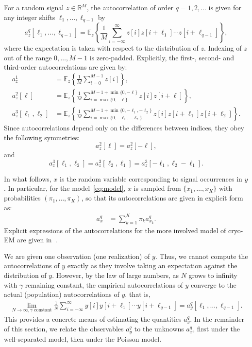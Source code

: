 \documentclass[12pt]{article}
\newcommand{\E}{\mathbb{E}}
\newcommand{\1}{\mathbf{1}}
\newcommand{\TODO}[1]{{\color{red}{[#1]}}}
\newcommand{\R}{\mathbb{R}}
\theoremstyle{plain}
\theoremstyle{definition}
\theoremstyle{remark}
\theoremstyle{plain}
\theoremstyle{remark}
\theoremstyle{plain}
\theoremstyle{plain}
\theoremstyle{plain}
\numberwithin{equation}{section}
\begin{document}
For a random signal $z\in \R^M$, the autocorrelation of order $q = 1, 2, \ldots$ is given for any integer shifts $\ell_1, \ldots, \ell_{q-1}$ by
\begin{equation}
a_z^q[\ell_1,\ldots,\ell_{q-1}]   = \E_z\left\{\frac{1}{M} \sum_{i=-\infty}^{\infty} z[i]z[i+\ell_1]\cdots z[i+\ell_{q-1}]\right\},
\label{eq:ac_general}
\end{equation}
where the expectation is taken with respect to the distribution of $z$. Indexing of $z$ out of the range $0, \ldots, M-1$ is zero-padded.
Explicitly, the first-, second- and third-order autocorrelations are given by: 
\begin{align}  
a_z^1 & = \E_z\left\{\frac{1}{M} \sum_{i=0}^{M-1} 
z[i]\right\}, \nonumber\\
a_z^2[\ell] & = \E_z\left\{\frac{1}{M} \sum_{i = \max\{0, -\ell\}}^{M-1 + \min\{0, -\ell\}} z[i]z[i+\ell]\right\}, \label{eq:ac_special} \\
a_z^3[\ell_1,\ell_2] & = \E_z\left\{\frac{1}{M} \sum_{i = \max\{0, -\ell_1, -\ell_2\}}^{M-1 + \min\{0, -\ell_1, -\ell_2\}} z[i]z[i+\ell_1]z[i+\ell_2]\right\}. \nonumber
\end{align}
Since  autocorrelations depend only on the differences between indices, they obey the following symmetries: $$a_z^2[\ell] = a_z^2[-\ell],$$ and
$$a_z^3[\ell_1,\ell_2] = a_z^3[\ell_2,\ell_1]=a_z^3[-\ell_1,\ell_2-\ell_1].
$$

In what follows, $x$ is the random variable corresponding to signal occurrences in $y$. In particular, for the model~\eqref{eq:model}, 
$x$ is sampled from $\{ x_1, \ldots, x_K \}$ with probabilities $(\pi_1, \ldots, \pi_K)$, so that its autocorrelations are given in explicit form as:
\begin{align}
	a_x^q  & = \sum_{k=1}^{K} \pi_ka_{x_k}^q.
	\label{eq:mixedautocorr}
\end{align}
Explicit expressions of the autocorrelations for the more involved model of  cryo-EM are given in~\cite{bendory2018toward}.

We are given one observation (one realization) of $y$. Thus, we cannot compute the autocorrelations of $y$ exactly as they involve taking an expectation against the distribution of $y$. However, by the law of large numbers, as $N$ grows to infinity with $\gamma$ remaining constant, the empirical autocorrelations of $y$ converge to the actual (population) autocorrelations of $y$, that is, %
\begin{align}
\lim_{N \to \infty, \gamma \textrm{ constant}} \frac{1}{N} \sum_{i=-\infty}^{\infty} y[i]y[i+\ell_1]\cdots y[i+\ell_{q-1}] = a_y^q[\ell_1, \ldots, \ell_{q-1}].
\end{align}
\TODO{Why do we need constant $\gamma$?}
This provides a concrete means of estimating the quantities $a_y^ q$. In the remainder of this section, we relate the observables $a_y^q$  to the unknowns $a_x^q$, first under the well-separated model, then under the Poisson model.
\end{document}

